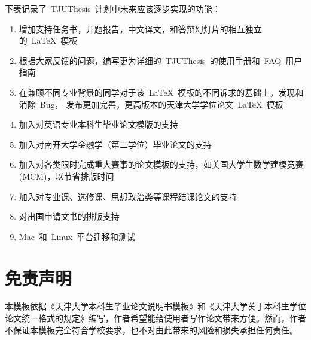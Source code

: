下表记录了~TJUThesis~计划中未来应该逐步实现的功能：
\begin{enumerate}
  \item 增加支持任务书，开题报告，中文译文，和答辩幻灯片的相互独立的~\LaTeX~模板
  \item 根据大家反馈的问题，编写更为详细的~TJUThesis~的使用手册和~FAQ~用户指南
  \item 在兼顾不同专业背景的同学对于该~LaTeX~模板的不同诉求的基础上，发现和消除~Bug， 发布更加完善，更高版本的天津大学学位论文~LaTeX~模板
  \item 加入对英语专业本科生毕业论文模版的支持
  \item 加入对南开大学金融学（第二学位）毕业论文的支持
  \item 加入对各类限时完成重大赛事的论文模板的支持，如美国大学生数学建模竞赛(MCM)，以节省排版时间
  \item 加入对专业课、选修课、思想政治类等课程结课论文的支持
  \item 对出国申请文书的排版支持
  \item Mac~和~Linux~平台迁移和测试
\end{enumerate}

\section{免责声明}

本模板依据《天津大学本科生毕业论文说明书模板》和《天津大学关于本科生学位论文统一格式的规定》编写，作者希望能给使用者写作论文带来方便。然而，作者不保证本模板完全符合学校要求，也不对由此带来的风险和损失承担任何责任。
